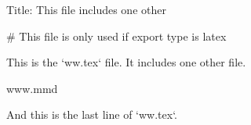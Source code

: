 Title: This file includes one other

# This file is only used if export type is latex

This is the `ww.tex` file. It includes one other file.

{{www.mmd}}

And this is the last line of `ww.tex`.
